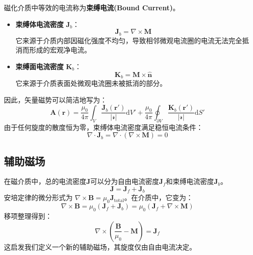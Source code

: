 \documentclass[fontset=none]{ctexart}
\begin{document}
\begin{definition}[束缚电流]
    磁化介质中等效的电流称为\textbf{束缚电流(Bound Current)}。
    \begin{itemize}
        \item \textbf{束缚体电流密度} $\bm{J}_b$：
        \begin{equation}
            \bm{J}_b = \nabla \times \bm{M}
        \end{equation}
        它来源于介质内部因磁化强度不均匀，导致相邻微观电流圈的电流无法完全抵消而形成的宏观净电流。
        \item \textbf{束缚面电流密度} $\bm{K}_b$：
        \begin{equation}
            \bm{K}_b = \bm{M} \times \hat{\bm{n}}
        \end{equation}
        它来源于介质表面处微观电流圈未被抵消的部分。
    \end{itemize}
\end{definition}
因此，矢量磁势可以简洁地写为：
\begin{equation}
    \bm{A}(\bm{r}) = \frac{\mu_0}{4\pi} \int_V \frac{\bm{J}_b(\bm{r}')}{|\bm{\mathscr{r}}|} \mathrm{d}V' + \frac{\mu_0}{4\pi} \oint_{\partial V} \frac{\bm{K}_b(\bm{r}')}{|\bm{\mathscr{r}}|} \mathrm{d}S'
\end{equation}
由于任何旋度的散度恒为零，束缚体电流密度满足稳恒电流条件：
\begin{equation}
    \nabla \cdot \bm{J}_b = \nabla \cdot (\nabla \times \bm{M}) = 0
\end{equation}

\subsection{辅助磁场}
在磁介质中，总的电流密度$\bm{J}$可以分为自由电流密度$\bm{J}_f$和束缚电流密度$\bm{J}_b$。
\begin{equation}
    \bm{J} = \bm{J}_f + \bm{J}_b
\end{equation}
安培定律的微分形式为 $\nabla \times \bm{B} = \mu_0 \bm{J}_{\text{total}}$。在介质中，它变为：
\begin{equation}
    \nabla \times \bm{B} = \mu_0 (\bm{J}_f + \bm{J}_b) = \mu_0 (\bm{J}_f + \nabla \times \bm{M})
\end{equation}
移项整理得到：
\begin{equation}
    \nabla \times \left( \frac{\bm{B}}{\mu_0} - \bm{M} \right) = \bm{J}_f
\end{equation}
这启发我们定义一个新的辅助磁场，其旋度仅由自由电流决定。
\end{document}
